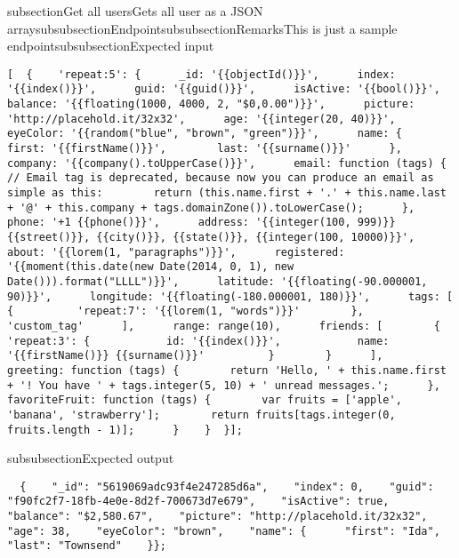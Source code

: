 subsection{Get all users}Gets all user as a JSON arraysubsubsection{Endpoint}subsubsection{Remarks}This is just a sample endpointsubsubsection{Expected input}\begin{lstlisting}[  {    'repeat:5': {      _id: '{{objectId()}}',      index: '{{index()}}',      guid: '{{guid()}}',      isActive: '{{bool()}}',      balance: '{{floating(1000, 4000, 2, "$0,0.00")}}',      picture: 'http://placehold.it/32x32',      age: '{{integer(20, 40)}}',      eyeColor: '{{random("blue", "brown", "green")}}',      name: {        first: '{{firstName()}}',        last: '{{surname()}}'      },      company: '{{company().toUpperCase()}}',      email: function (tags) {        // Email tag is deprecated, because now you can produce an email as simple as this:        return (this.name.first + '.' + this.name.last + '@' + this.company + tags.domainZone()).toLowerCase();      },      phone: '+1 {{phone()}}',      address: '{{integer(100, 999)}} {{street()}}, {{city()}}, {{state()}}, {{integer(100, 10000)}}',      about: '{{lorem(1, "paragraphs")}}',      registered: '{{moment(this.date(new Date(2014, 0, 1), new Date())).format("LLLL")}}',      latitude: '{{floating(-90.000001, 90)}}',      longitude: '{{floating(-180.000001, 180)}}',      tags: [        {          'repeat:7': '{{lorem(1, "words")}}'        },        'custom_tag'      ],      range: range(10),      friends: [        {          'repeat:3': {            id: '{{index()}}',            name: '{{firstName()}} {{surname()}}'          }        }      ],      greeting: function (tags) {        return 'Hello, ' + this.name.first + '! You have ' + tags.integer(5, 10) + ' unread messages.';      },      favoriteFruit: function (tags) {        var fruits = ['apple', 'banana', 'strawberry'];        return fruits[tags.integer(0, fruits.length - 1)];      }    }  }];\end{lstlisting}subsubsection{Expected output}\begin{lstlisting}  {    "_id": "5619069adc93f4e247285d6a",    "index": 0,    "guid": "f90fc2f7-18fb-4e0e-8d2f-700673d7e679",    "isActive": true,    "balance": "$2,580.67",    "picture": "http://placehold.it/32x32",    "age": 38,    "eyeColor": "brown",    "name": {      "first": "Ida",      "last": "Townsend"    }};\end{lstlisting}
